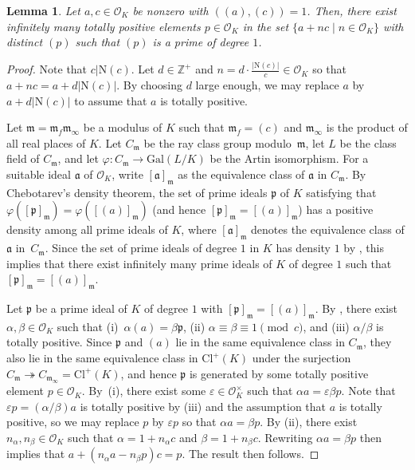 \documentclass[11pt]{amsart}
\newtheorem{lemma}[theorem]{Lemma}
\theoremstyle{remark}
\newcommand\fr[1]{\mathfrak{#1}}
\newcommand{\inte}{\mathbb{Z}}
\newcommand{\eps}{\varepsilon}
\newcommand{\vphi}{\varphi}
\newcommand{\clo}{\mathcal{O}}
\newcommand{\N}{\mathrm{N}}
\newcommand{\Gal}{\mathrm{Gal}}
\newcommand{\Cl}{\mathrm{Cl}}
\begin{document}
\begin{lemma}
\label{dirichlet}
Let $a,c\in\clo_K$ be nonzero with $((a),(c))=1$. Then, there exist infinitely many totally positive elements $p\in\clo_K$ in the set \mbox{$\{a+nc\mid n\in\clo_K\}$} with distinct $(p)$ such that $(p)$ is a prime of degree $1$.
\end{lemma}
\begin{proof}
Note that $c|\N(c)$. Let $d\in\inte^+$ and $n=d\cdot\frac{|\N(c)|}{c}\in\clo_K$ so that $a+nc=a+d|\N(c)|$. By choosing $d$ large enough, we may replace $a$ by $a+d|\N(c)|$ to assume that $a$ is totally positive.

Let $\fr{m}=\fr{m}_f\fr{m}_\infty$ be a modulus of $K$ such that $\fr{m}_f=(c)$ and $\fr{m}_\infty$ is the product of all real places of $K$. Let $C_\fr{m}$ be the ray class group modulo~$\fr{m}$, let $L$ be the class field of $C_\fr{m}$, and let $\vphi:C_\fr{m}\rightarrow\Gal(L/K)$ be the Artin isomorphism. For a suitable ideal $\fr{a}$ of $\clo_K$, write $[\fr{a}]_\fr{m}$ as the equivalence class of $\fr{a}$ in $C_\fr{m}$. By Chebotarev's density theorem, the set of prime ideals $\fr{p}$ of $K$ satisfying that $\vphi([\fr{p}]_\fr{m})=\vphi([(a)]_\fr{m})$ (and hence $[\fr{p}]_\fr{m}=[(a)]_\fr{m}$) has a positive density among all prime ideals of $K$, where $[\fr{a}]_\fr{m}$ denotes the equivalence class of $\fr{a}$ in~$C_\fr{m}$. Since the set of prime ideals of degree $1$ in $K$ has density $1$ by , this implies that there exist infinitely many prime ideals of $K$ of degree $1$ such that $[\fr{p}]_\fr{m}=[(a)]_\fr{m}$. 

Let $\fr{p}$ be a prime ideal of $K$ of degree $1$ with $[\fr{p}]_\fr{m}=[(a)]_\fr{m}$. By , there exist $\alpha,\beta\in\clo_K$ such that (i)~$\alpha(a)=\beta\fr{p}$, (ii) $\alpha\equiv\beta\equiv1\pmod{c}$, and (iii) $\alpha/\beta$ is totally positive. Since $\fr{p}$ and $(a)$ lie in the same equivalence class in $C_\fr{m}$, they also lie in the same equivalence class in $\Cl^+(K)$ under the surjection $C_\fr{m}\twoheadrightarrow C_{\fr{m}_\infty}=\Cl^+(K)$, and hence $\fr{p}$ is generated by some totally positive element $p\in\clo_K$. By~(i), there exist some $\eps\in\clo_K^\times$ such that $\alpha a=\eps\beta p$. Note that $\eps p=(\alpha/\beta)a$ is totally positive by (iii) and the assumption that $a$ is totally positive, so we may replace $p$ by $\eps p$ so that $\alpha a=\beta p$. By (ii), there exist $n_\alpha,n_\beta\in\clo_K$ such that $\alpha=1+n_\alpha c$ and $\beta=1+n_\beta c$. Rewriting $\alpha a=\beta p$ then implies that $a+(n_\alpha a-n_\beta p)c=p$. The result then follows.
\end{proof}



\end{document}
